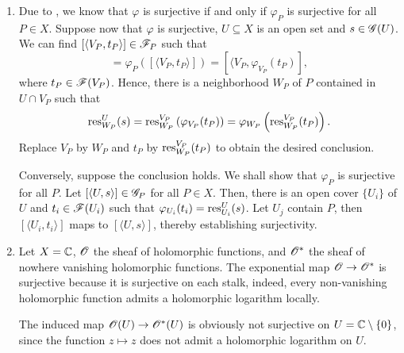 \begin{exercise}
\begin{enumerate}[label=(\alph*)]
    \item Due to , we know that $\varphi$ is surjective if and only if $\varphi_P$ is surjective for all $P\in X$. Suppose now that $\varphi$ is surjective, $U\subseteq X$ is an open set and $s\in\mathscr{G}(U)$. We can find $[\langle V_P, t_P\rangle]\in\mathscr{F}_P$ such that 
    \begin{equation*}
        [\langle U,s\rangle] = \varphi_P\left([\langle V_P, t_P\rangle]\right) = [\langle V_P, \varphi_{V_P}(t_P)],
    \end{equation*}
    where $t_P\in\mathscr{F}(V_P)$. Hence, there is a neighborhood $W_P$ of $P$ contained in $U\cap V_P$ such that 
    \begin{equation*}
    \operatorname{res}^U_{W_P}(s) = \operatorname{res}^{V_P}_{W_P}\left(\varphi_{V_P}(t_P)\right) = \varphi_{W_P}\left(\operatorname{res}^{V_P}_{W_P}(t_P)\right).
    \end{equation*}
    Replace $V_P$ by $W_P$ and $t_P$ by $\operatorname{res}^{V_P}_{W_P}(t_P)$ to obtain the desired conclusion.

    Conversely, suppose the conclusion holds. We shall show that $\varphi_P$ is surjective for all $P$. Let $[\langle U, s\rangle]\in\mathscr{G}_P$ for all $P\in X$. Then, there is an open cover $\{U_i\}$ of $U$ and $t_i\in\mathscr{F}(U_i)$ such that $\varphi_{U_i}(t_i) = \operatorname{res}^U_{U_i}(s)$. Let $U_j$ contain $P$, then $[\langle U_i, t_i\rangle]$ maps to $[\langle U, s\rangle]$, thereby establishing surjectivity.

    \item Let $X = \mathbb{C}$, $\mathscr{O}$ the sheaf of holomorphic functions, and $\mathscr{O}^\ast$ the sheaf of nowhere vanishing holomorphic functions. The exponential map $\mathscr{O}\to\mathscr{O}^\ast$ is surjective because it is surjective on each stalk, indeed, every non-vanishing holomorphic function admits a holomorphic logarithm locally. 
    
    The induced map $\mathscr{O}(U)\to\mathscr{O}^\ast(U)$ is obviously not surjective on $U = \mathbb{C}\setminus\{0\}$, since the function $z\mapsto z$ does not admit a holomorphic logarithm on $U$.
\end{enumerate}
\end{exercise}

